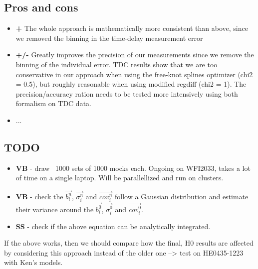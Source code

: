 \documentclass[11pt]{scrartcl}
\renewcommand{\vec}{\overrightarrow}  %
\begin{document}
\subsection{Pros and cons}

\begin{itemize}
 \item \textbf{+} The whole approach is mathematically more consistent 
than above, since we removed the binning in the time-delay measurement 
error
 \item \textbf{+/-} Greatly improves the precision of our measurements 
since we remove the binning of the individual error. TDC results show 
that we are too conservative in our approach when using the free-knot 
splines optimizer (chi2 = 0.5), but roughly reasonable when using 
modified regdiff (chi2 = 1). The precision/accuracy ration needs to be 
tested more intensively using both formalism on TDC data.
 \item ...
\end{itemize}


\subsection{TODO}
\begin{itemize}
 \item \textbf{VB} - draw ~1000 sets of 1000 mocks each. Ongoing on 
WFI2033, takes a lot of time on a single laptop. Will be 
parallellized and run on clusters.
 \item \textbf{VB} - check the $\vec{b^n_i}$, $\vec{\sigma^n_i}$ and 
$\vec{cov^n_i}$ follow a Gaussian distribution and estimate their 
variance around the $\vec{b^0_i}$, $\vec{\sigma^0_i}$ and 
$\vec{cov^0_i}$.
 \item \textbf{SS} - check if the above equation can be 
analytically integrated.
 
\end{itemize}

If the above works, then we should compare how the final, H0 results 
are affected by considering this approach instead of the older one --> 
test on HE0435-1223 with Ken's models.
\end{document}
